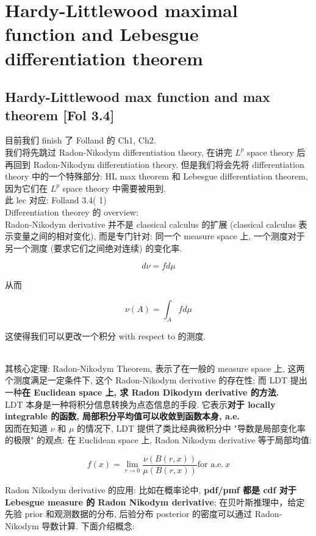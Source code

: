 \chapter{Hardy-Littlewood maximal function and Lebesgue differentiation theorem}\label{hardy-littlewood-maximal-function-and-lebesgue-differentiation-theorem}

\section{Hardy-Littlewood max function and max theorem {[}Fol 3.4{]}}

目前我们 finish 了 Folland 的 Ch1, Ch2.\\
我们将先跳过 Radon-Nikodym differentiation theory, 在讲完 \(L^{p}\) space theory 后再回到 Radon-Nikodym differentiation theory. 但是我们将会先将 differentiation theory 中的一个特殊部分: HL max theorem 和 Lebesgue differentiation theorem, 因为它们在 \(L^{p}\) space theory 中需要被用到.\\
此 lec 对应: Folland 3.4( 1)\\
Differentiation theorey 的 overview:\\
Radon-Nikodym derivative 并不是 classical calculus 的扩展 (classical calculus 表示变量之间的相对变化), 而是专门针对: 同一个 measure space 上, 一个测度对于另一个测度 (要求它们之间绝对连续) 的变化率.

\[d\nu = fd\mu\]

从而

\[\nu(A) = \int_{A}f d\mu\]

这使得我们可以更改一个积分 with respect to 的测度.\\
\strut \\
其核心定理: Radon-Nikodym Theorem, 表示了在一般的 measure space 上, 这两个测度满足一定条件下, 这个 Radon-Nikodym derivative 的存在性; 而 LDT 提出一种\textbf{在 Euclidean space 上, 求 Radon Dikodym derivative 的方法.}\\
LDT 本身是一种将积分信息转换为点态信息的手段. 它表示\textbf{对于 locally integrable 的函数, 局部积分平均值可以收敛到函数本身, a.e.}\\
因而在知道 \(\nu\) 和 \(\mu\) 的情况下, LDT 提供了类比经典微积分中 "导数是局部变化率的极限" 的观点: 在 Euclidean space 上, Radon Nikodym derivative 等于局部均值:

\[f(x) = \lim\limits_{r\rightarrow 0}\frac{\nu(B(r,x))}{\mu(B(r,x))}\text{for a.e.}\ x\]

Radon Nikodym derivative 的应用: 比如在概率论中, \textbf{pdf/pmf 都是 cdf 对于 Lebesgue measure 的 Radon Nikodym derivative}; 在贝叶斯推理中，给定先验 prior 和观测数据的分布, 后验分布 posterior 的密度可以通过 Radon-Nikodym 导数计算. 下面介绍概念:\\
\strut \\

